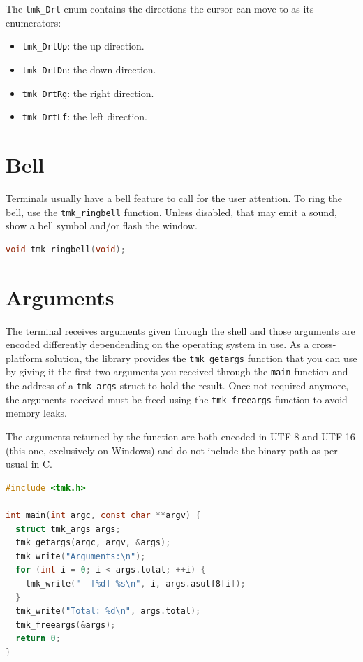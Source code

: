 \documentclass{report}
\begin{document}
The \texttt{tmk\_Drt} enum contains the directions the cursor can move to as its enumerators:
\begin{itemize}
  \item \texttt{tmk\_DrtUp}: the up direction.
  \item \texttt{tmk\_DrtDn}: the down direction.
  \item \texttt{tmk\_DrtRg}: the right direction.
  \item \texttt{tmk\_DrtLf}: the left direction.
\end{itemize}
\section{Bell}
Terminals usually have a bell feature to call for the user attention. To ring the bell, use the \texttt{tmk\_ringbell} function. Unless disabled, that may emit a sound, show a bell symbol and/or flash the window.
\begin{lstlisting}[language=c,caption=the declaration of the \texttt{tmk\_ringbell} function.]
void tmk_ringbell(void);
\end{lstlisting}
\section{Arguments}
The terminal receives arguments given through the shell and those arguments are encoded differently dependending on the operating system in use. As a cross-platform solution, the library provides the \texttt{tmk\_getargs} function that you can use by giving it the first two arguments you received through the \texttt{main} function and the address of a \texttt{tmk\_args} struct to hold the result. Once not required anymore, the arguments received must be freed using the \texttt{tmk\_freeargs} function to avoid memory leaks.

The arguments returned by the function are both encoded in UTF-8 and UTF-16 (this one, exclusively on Windows) and do not include the binary path as per usual in C.
\begin{lstlisting}[language=c,caption=an example that gets the command line arguments.]
#include <tmk.h>

int main(int argc, const char **argv) {
  struct tmk_args args;
  tmk_getargs(argc, argv, &args);
  tmk_write("Arguments:\n");
  for (int i = 0; i < args.total; ++i) {
    tmk_write("  [%d] %s\n", i, args.asutf8[i]);
  }
  tmk_write("Total: %d\n", args.total);
  tmk_freeargs(&args);
  return 0;
}
\end{lstlisting}
\end{document}

